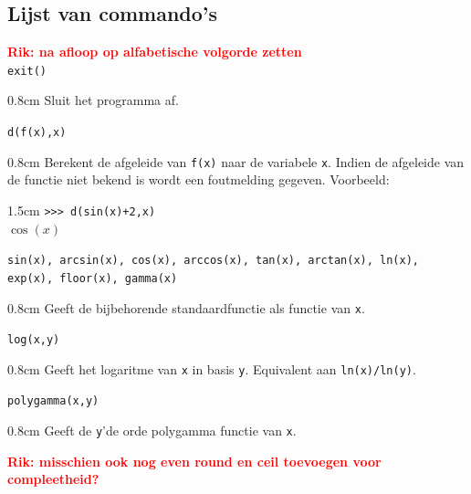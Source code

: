\documentclass[a4paper]{article}
\newcommand{\rcom}[1]{\textbf{\textcolor{red}{#1}}}
\newcommand{\com}[2]{\texttt{#1}\mbox{}\vspace{-2ex}\begin{adjustwidth}{0.8cm}{} #2 \end{adjustwidth}}
\begin{document}
\subsection{Lijst van commando's}
\rcom{Rik: na afloop op alfabetische volgorde zetten\\}
\com{exit()}{Sluit het programma af.}
\com{d(f(x),x)}{Berekent de afgeleide van \texttt{f(x)} naar de variabele \texttt{x}. Indien de afgeleide van de functie niet bekend is wordt een foutmelding gegeven. Voorbeeld:\vspace{-0.5ex}}
\begin{adjustwidth}{1.5cm}{}
\texttt{>>> d(sin(x)+2,x)}\\
$\cos(x)$
\end{adjustwidth}

\com{sin(x), arcsin(x), cos(x), arccos(x), tan(x), arctan(x), ln(x), exp(x), floor(x), gamma(x)}{Geeft de bijbehorende standaardfunctie als functie van \texttt{x}.}
\com{log(x,y)}{Geeft het logaritme van \texttt{x} in basis \texttt{y}. Equivalent aan \texttt{ln(x)/ln(y)}.}
\com{polygamma(x,y)}{Geeft de \texttt{y}'de orde polygamma functie van \texttt{x}.}

\rcom{Rik: misschien ook nog even round en ceil toevoegen voor compleetheid?}
\end{document}
